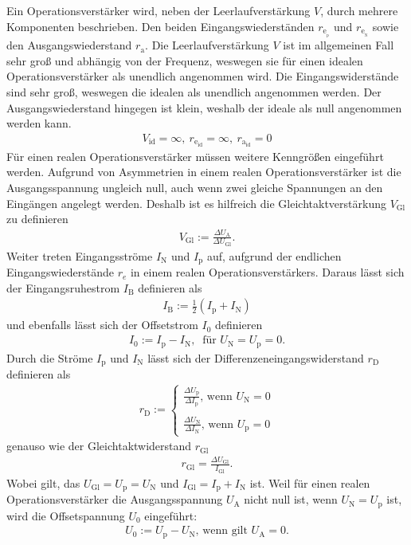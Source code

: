 Ein  Operationsverstärker wird, neben der Leerlaufverstärkung $V$, durch mehrere Komponenten beschrieben.
Den beiden Eingangswiederständen $r_{\text{e}_{{}_\text{p}}}$ und $r_{\text{e}_{{}_\text{N}}}$ sowie den Ausgangswiederstand $r_\text{a}$.
Die Leerlaufverstärkung $V$ ist im allgemeinen Fall sehr groß und abhängig von der Frequenz, weswegen sie für einen idealen Operationsverstärker als unendlich angenommen wird.
Die Eingangswiderstände sind sehr groß, weswegen die idealen als unendlich angenommen werden.
Der Ausgangswiederstand hingegen ist klein, weshalb der ideale als null angenommen werden kann.
\begin{align}
	V_\text{id}=\infty,~ r_{\text{e}_\text{id}}=\infty,~ r_{\text{a}_\text{id}}=0
\end{align}
Für einen realen Operationsverstärker müssen weitere Kenngrößen eingeführt werden.
Aufgrund von Asymmetrien in einem realen Operationsverstärker ist die Ausgangsspannung ungleich null, auch wenn zwei gleiche Spannungen an den Eingängen angelegt werden.
Deshalb ist es hilfreich die Gleichtaktverstärkung $V_\text{Gl}$ zu definieren 
\begin{align}
	V_\text{Gl}:=\frac{\Delta U_\text{A}}{\Delta U_\text{Gl}}.
\end{align}
Weiter treten Eingangsströme $I_\text{N}$ und $I_\text{p}$ auf, aufgrund der endlichen Eingangswiederstände $r_e$ in einem realen Operationsverstärkers.
Daraus lässt sich der Eingangsruhestrom $I_\text{B}$ definieren als
\begin{align}
	I_\text{B}:=\frac{1}{2}\left( I_\text{p} + I_\text{N} \right)
\end{align}
und ebenfalls lässt sich der Offsetstrom $I_0$ definieren
\begin{align}
	I_0:=I_\text{p}-I_\text{N},~ \text{ für }U_\text{N}=U_\text{p}=0.
\end{align}
Durch die Ströme $I_\text{p}$ und $I_\text{N}$ lässt sich der Differenzeneingangswiderstand $r_\text{D}$ definieren als
\begin{align}
	r_\text{D}:=
	\begin{cases}
		\frac{\Delta U_\text{p}}{\Delta I_\text{p}}\text{, wenn } U_\text{N}=0\\
		\\
		\frac{\Delta U_\text{N}}{\Delta I_\text{N}}\text{, wenn } U_\text{p}=0
	\end{cases}
\end{align}
genauso wie der Gleichtaktwiderstand $r_\text{Gl}$
\begin{align}
	r_\text{Gl}=\frac{\Delta U_\text{Gl}}{I_\text{Gl}}.
\end{align}
Wobei gilt, das $U_\text{Gl}=U_\text{p}=U_\text{N}$ und $I_\text{Gl}=I_\text{p}+I_\text{N}$ ist.
Weil für einen realen Operationsverstärker die Ausgangsspannung $U_\text{A}$ nicht null ist, wenn $U_\text{N}=U_\text{p}$ ist, wird die Offsetspannung $U_0$ eingeführt:
\begin{align}
	U_0:=U_\text{p}-U_\text{N}\text{, wenn gilt }U_\text{A}=0.
\end{align}
